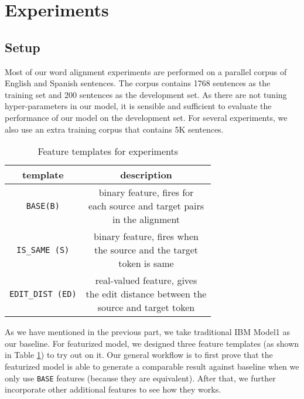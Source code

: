 \documentclass[11pt,letterpaper]{article}
\begin{document}
\section{Experiments}
\subsection{Setup}
Most of our word alignment experiments are performed on a parallel corpus of English and Spanish sentences.
The corpus contains 1768 sentences as the training set and 200 sentences as the development set.
As there are not tuning hyper-parameters in our model, it is sensible and sufficient to evaluate the performance of our model on the development set.
For several experiments, we also use an extra training corpus that contains 5K %
sentences.

\begin{table}[h]
\begin{center}
\begin{tabular}{|c|c|}
\hline 
\bf template & \bf description \\
\hline
\texttt{BASE(B)} & \makecell[l]{binary feature, fires for\\ each source and target pairs\\ in the alignment} \\
\texttt{IS\_SAME (S)} & \makecell[l]{binary feature, fires when\\ the source and the target\\ token is same}\\
\texttt{EDIT\_DIST (ED)} & \makecell[l]{real-valued feature, gives\\ the edit distance between the\\ source and target token}\\
\hline
\end{tabular}
\end{center}
\caption{\label{featureset-table} Feature templates for experiments}
\end{table}

As we have mentioned in the previous part, we take traditional IBM Model1 as our baseline.
For featurized model, we designed three feature templates (as shown in Table \ref{featureset-table}) to try out on it.
Our general workflow is to first prove that the featurized model is able to generate a comparable result against baseline when we only use \texttt{BASE} features (because they are equivalent).
After that, we further incorporate other additional features to see how they works.
\end{document}
